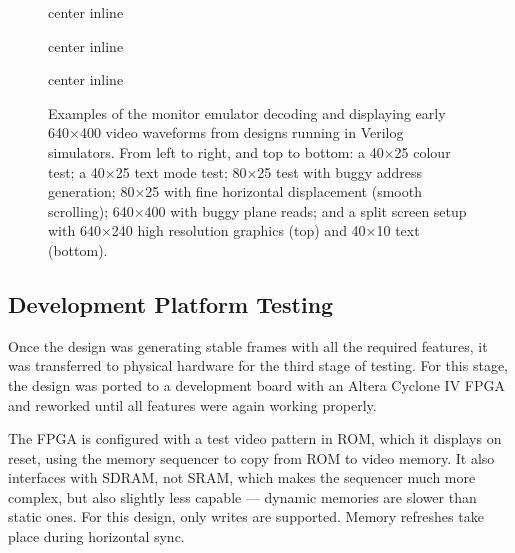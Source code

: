 \begin{figure}
  \centering
  \begin{htmldiv}{center inline}
    \hfill
  \end{htmldiv}
  \vspace{1em}

  \begin{htmldiv}{center inline}
    \hfill
  \end{htmldiv}
  \vspace{1em}

  \begin{htmldiv}{center inline}
    \hfill
  \end{htmldiv}
  \caption[Monitor Emulator Examples]{\label{fig:vdu:monitor-emu-examples}Examples of the monitor
    emulator decoding and displaying early 640×400 video waveforms from designs
    running in Verilog simulators. From left to right, and top to bottom: a
    40×25 colour test; a 40×25 text mode test; 80×25 test with buggy address
    generation; 80×25 with fine horizontal displacement (smooth scrolling);
    640×400 with buggy plane reads; and a split screen setup with 640×240 high
    resolution graphics (top) and 40×10 text (bottom).}
\end{figure}

\subsection{Development Platform Testing}

Once the design was generating stable frames with all the required features, it
was transferred to physical hardware for the third stage of testing. For this
stage, the design was ported to a development board with an Altera Cyclone IV
FPGA and reworked until all features were again working properly.

The FPGA is configured with a test video pattern in ROM, which it displays on
reset, using the memory sequencer to copy from ROM to video memory. It also
interfaces with \gls{SDRAM}, not \gls{SRAM}, which makes the sequencer much
more complex, but also slightly less capable — dynamic memories are slower than
static ones. For this design, only writes are supported. Memory refreshes take
place during horizontal sync.

